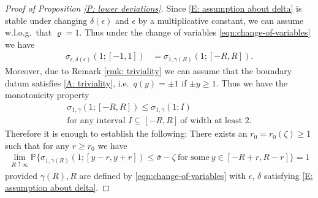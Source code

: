 \documentclass[12pt]{amsart}
\begin{document}
\begin{proof}[Proof of Proposition \ref{P: lower deviations}]
	Since \eqref{E: assumption about delta} is stable under changing $ \delta( \epsilon ) $ and $ \epsilon $ by a multiplicative constant, we can assume w.l.o.g.~that $ \varrho = 1 $.
	Thus under the change of variables \eqref{eqn:change-of-variables} we have 
	\begin{align*}
		\sigma_{ \epsilon, \delta ( \epsilon ) } ( 1; [- 1, 1 ] )
		&= \sigma_{ 1 , \gamma ( R ) } ( 1  ; [ - R , R ] ) .
	\end{align*}
	Moreover, due to Remark \ref{rmk: triviality} we can assume that the boundary datum satisfies \eqref{A: triviality}, i.e.~$ q ( y ) = \pm 1 $ if $ \pm y \geq 1 $. Thus we have the monotonicity property
	\begin{gather}
		\sigma_{ 1 , \gamma } ( 1; [ - R , R ] ) \leq \sigma_{ 1 , \gamma } ( 1; I ) \nonumber \\
		 \text{for any interval } I \subseteq [ - R , R ]  ~ \text{of width at least } 2 . \nonumber
	\end{gather}
	Therefore it is enough to establish the following: There exists an $ r_0 = r_0 ( \zeta ) \geq 1 $ such that for any $ r \geq r_0 $ we have
	\begin{align}\label{varm02}
		\lim_{ R \uparrow \infty } \mathbb{P} \big\{  \sigma_{ 1 , \gamma(R) } ( 1;  [ y - r , y + r ] ) \leq \bar\sigma - \zeta ~ \text{for some} ~ y \in [ - R + r , R - r  ] \big\} = 1
	\end{align}
	provided $ \gamma(R), R $ are defined by \eqref{eqn:change-of-variables} with $ \epsilon $, $ \delta $ satisfying \eqref{E: assumption about delta}.
	

\end{proof}
\end{document}
